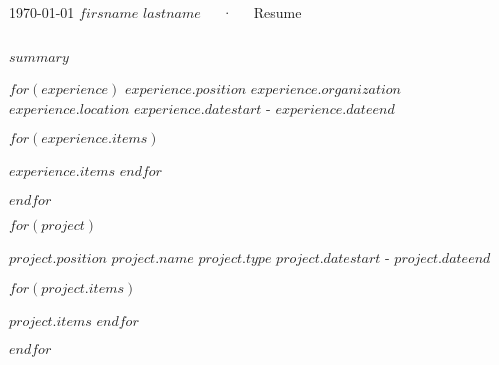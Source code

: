 \documentclass[11pt, a4paper]{awesome-cv}
\begin{document}
\makecvheader[C]

\makecvfooter
  {\today}
  {$firsname$ $lastname$~~~·~~~Resume}
  {\thepage}


\begin{cvparagraph}
\\
$summary$
\end{cvparagraph}


\begin{cventries}
$for(experience)$
  \cventry
    {$experience.position$} %
    {$experience.organization$} %
    {$experience.location$} %
    {$experience.datestart$ - $experience.dateend$} %
    {
      \begin{cvitems} %
        $for(experience.items)$
        \item{$experience.items$}
        $endfor$
      \end{cvitems}
    }
    \linebreak
$endfor$
\end{cventries}




\begin{cventries}
$for(project)$
  
  \cventry
    {$project.position$} %
    {$project.name$} %
    {$project.type$} %
    {$project.datestart$ - $project.dateend$} %
    {
      \begin{cvitems} %
        $for(project.items)$
        \item{$project.items$}
        $endfor$
      \end{cvitems}
    }
    \linebreak
$endfor$

\end{cventries}
\end{document}
